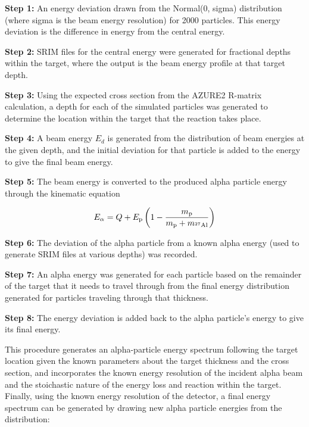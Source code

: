 \textbf{Step 1:}
  An energy deviation drawn from the Normal(0, sigma) distribution
  (where sigma is the beam energy resolution) for 2000 particles. This
  energy deviation is the difference in energy from the central energy.

\textbf{Step 2:}
  SRIM files for the central energy were generated for fractional depths
  within the target, where the output is the beam energy profile at that
  target depth.

\textbf{Step 3:}
  Using the expected cross section from the AZURE2 R-matrix calculation,
  a depth for each of the simulated particles was generated to determine
  the location within the target that the reaction takes place.

\textbf{Step 4:}
  A beam energy $E_d$ is generated from the distribution of beam energies
  at the given depth, and the initial deviation for that particle is
  added to the energy to give the final beam energy.

\textbf{Step 5:}
  The beam energy is converted to the produced alpha particle energy
  through the kinematic equation

\begin{equation}
    E_{\alpha} = Q + E_{\rm p}\left(
        1 - \frac{m_{\rm p}}{m_{\rm p} + m_{{}^{27}\rm{Al}}} %
    \right)
\end{equation}


\textbf{Step 6:}
  The deviation of the alpha particle from a known alpha energy (used to
  generate SRIM files at various depths) was recorded.

\textbf{Step 7:}
  An alpha energy was generated for each particle based on the remainder
  of the target that it needs to travel through from the final energy
  distribution generated for particles traveling through that thickness.

\textbf{Step 8:}
  The energy deviation is added back to the alpha particle's energy to
  give its final energy.

This procedure generates an alpha-particle energy spectrum following the
target location given the known parameters about the target thickness
and the cross section, and incorporates the known energy resolution of
the incident alpha beam and the stoichastic nature of the energy loss
and reaction within the target. Finally, using the known energy
resolution of the detector, a final energy spectrum can be generated by
drawing new alpha particle energies from the distribution:

